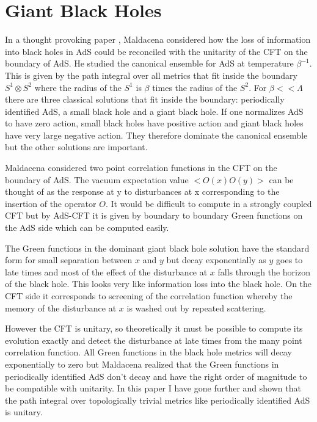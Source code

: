 \documentclass[aps,prd,groupedaddress,showpacs]{revtex4}
\begin{document}
\section{Giant Black Holes }

In a thought provoking paper \cite{Maldacena1}, Maldacena considered how the loss of information into black holes in AdS could be reconciled with the unitarity of the CFT on the boundary of AdS. He studied the canonical ensemble for AdS at temperature $\beta^{-1}$. This is given by the path integral over all metrics that fit inside the boundary $S^1\otimes S^2$ where the radius of the $S^1$ is $\beta$ times the radius of the $S^2$. For $\beta <<  \Lambda$ there are three classical solutions that fit inside the boundary: periodically identified AdS, a small black hole and a giant black hole. If one normalizes AdS to have zero action, small black holes have positive action and giant black holes have very large negative action. They therefore dominate the canonical ensemble but the other solutions are important. 

Maldacena considered two point correlation functions in the CFT on the boundary of AdS. The vacuum expectation value $<O(x) O (y)>$ can be thought of as the response at y to disturbances at x corresponding to the insertion of the operator $O$.  It would be difficult to compute in a strongly coupled CFT but by AdS-CFT it is given by boundary to boundary Green functions on the AdS side which can be computed easily. 

The Green functions in the dominant giant black hole solution have the standard form for small separation between $x$ and $y$ but decay exponentially as $y$ goes to late times and most of the effect of the disturbance at $x$ falls through the horizon of the black hole. This looks very like information loss into the black hole. On the CFT side it corresponds to screening of the correlation function whereby the memory of the disturbance at $x$ is washed out by repeated scattering. 

However the CFT is unitary, so theoretically it must be possible to compute its evolution exactly and detect the disturbance at late times from the many point correlation function. All Green functions in the black hole metrics will decay exponentially to zero but Maldacena realized that the Green functions in periodically identified AdS don't decay and have the right order of magnitude to be compatible with unitarity. In this paper I have gone further and shown that the path integral over topologically trivial metrics like periodically identified AdS is unitary.  
\end{document}

